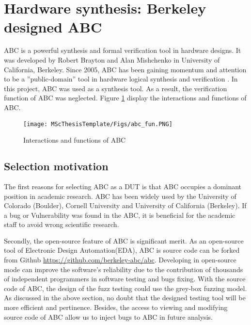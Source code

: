 \section{Hardware synthesis: Berkeley designed ABC}
ABC is a powerful synthesis and formal verification tool in hardware designs. It was developed by Robert Brayton and Alan Mishchenko in University of California, Berkeley. Since 2005, ABC has been gaining momentum and attention to be a ''public-domain'' tool in hardware logical synthesis and verification \cite{ABC}. In this project, ABC was used as a synthesis tool. As a result, the verification function of ABC was neglected. Figure \ref{fig:abc_fun} display the interactions and functions of ABC.
\begin{figure}[htbp]
    \centering
    \texttt{[image: MScThesisTemplate/Figs/abc\_fun.PNG]}
    \caption{\footnotesize Interactions and functions of ABC \cite{ABC}}
    \label{fig:abc_fun}
\end{figure}

\subsection{Selection motivation}
The first reasons for selecting ABC as a DUT is that ABC occupies a dominant position in academic research. ABC has been widely used by the University of Colorado (Boulder), Cornell University and University of California (Berkeley). If a bug or Vulnerability was found in the ABC, it is beneficial for the academic staff to avoid wrong scientific research. 

Secondly, the open-source feature of ABC is significant merit. As an open-source tool of Electronic Design Automation(EDA), ABC is source code can be forked from Github \url{https://github.com/berkeley-abc/abc}. Developing in open-source mode can improve the software's reliability due to the contribution of thousands of independent programmers in software testing and bugs fixing.\cite{laurent2004understanding} With the source code of ABC, the design of the fuzz testing could use the grey-box fuzzing model. As discussed in the above section, no doubt that the designed testing tool will be more efficient and pertinence. Besides, the access to viewing and modifying source code of ABC allow us to inject bugs to ABC in future analysis.

